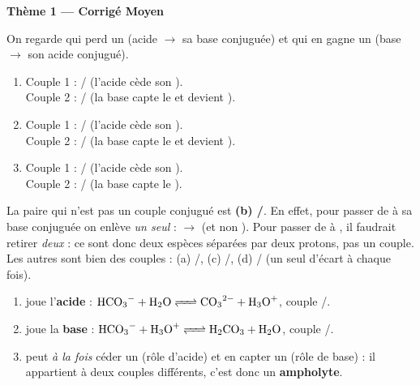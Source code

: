 \documentclass[11pt,a4paper]{article}
\begin{document}
\begin{center}
{\LARGE\bfseries\color{primarydark} Thème 1 --- Corrigé Moyen}
\end{center}

\begin{corrbox}
On regarde qui perd un  (acide $\to$ sa base conjuguée) et qui en gagne un (base $\to$ son acide conjugué).
\begin{enumerate}[label=\alph*),leftmargin=1.6em,itemsep=3pt]
  \item Couple 1 : / (l'acide  cède son ).\\
        Couple 2 : / (la base  capte le  et devient ).
  \item Couple 1 : / (l'acide  cède son ).\\
        Couple 2 : / (la base  capte le  et devient ).
  \item Couple 1 : / (l'acide  cède son ).\\
        Couple 2 : / (la base  capte le ).
\end{enumerate}
\end{corrbox}

\begin{corrbox}
La paire qui n'est pas un couple conjugué est \textbf{(b) /}. En effet, pour passer de
 à sa base conjuguée on enlève \emph{un seul}  :  $\to$  (et non ).
Pour passer de  à , il faudrait retirer \emph{deux}  : ce sont donc deux espèces
séparées par deux protons, pas un couple. \\
Les autres sont bien des couples : (a) /, (c) /,
(d) / (un seul  d'écart à chaque fois).
\end{corrbox}

\begin{corrbox}
\begin{enumerate}[label=\alph*),leftmargin=1.6em,itemsep=3pt]
  \item {} joue l'\textcolor{acidecol}{\textbf{acide}} : $\ce{HCO3- + H2O <=> CO3^{2-} + H3O+}$,
        couple /.
  \item {} joue la \textcolor{basecol}{\textbf{base}} : $\ce{HCO3- + H3O+ <=> H2CO3 + H2O}$,
        couple /.
  \item {} peut \emph{à la fois} céder un  (rôle d'acide) et en capter un (rôle de base) : il
        appartient à deux couples différents, c'est donc un \textbf{ampholyte}.
\end{enumerate}
\end{corrbox}
\end{document}
